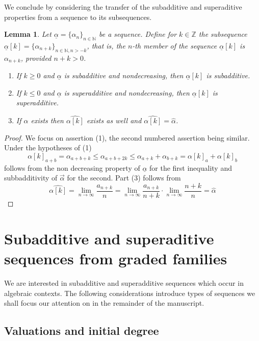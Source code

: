 \documentclass[12pt, reqno]{amsart}
\numberwithin{equation}{section}
\def\a{\ensuremath{\alpha}}
\def\ua{\ensuremath{\underline{\alpha}}}
\newcommand{\wa}{\widehat{\alpha}}
\newcommand{\N}{{\mathbb N}}
\newcommand{\Z}{{\mathbb Z}}
\theoremstyle{plain} %
\newtheorem{lem}[thm]{Lemma}
\theoremstyle{definition}
\theoremstyle{remark}
\newcommand{\au}{\overrightarrow{\alpha}}
\begin{document}
We conclude by considering the transfer of the subadditive and superaditive properties from a sequence to its subsequences.

\begin{lem}
\label{lem:subseq}
Let $\ua=\{\a_n\}_{n\in\N}$ be a sequence. Define for $k\in\Z$ the subsequence $\ua[k]=\{\a_{n+k}\}_{n\in\N,n> -k}$, that is, the $n$-th member of the sequence $\ua[k]$ is $\a_{n+k}$, provided $n+k>0$.
\begin{enumerate}
\item If $k\ge 0$ and $\ua$ is subadditive and nondecreasing, then $\ua[k]$ is subadditive.
\item If $k\le 0$ and $\ua$ is superadditive and nondecreasing, then $\ua[k]$ is superadditive.
\item If $\wa$ exists then $\widehat{\a[k]}$ exists as well and $\widehat{\a[k]}=\wa$.
\end{enumerate}

\end{lem}
\begin{proof}
We focus on assertion (1), the second numbered assertion being similar. Under the hypotheses of (1)
\[
\a[k]_{a+b}=\a_{a+b+k} \leq \a_{a+b+2k} \leq \a_{a+k}+\a_{b+k}=\a[k]_a+\a[k]_b
\]
follows from the non decreasing property of $\ua$  for the first inequality and subbadditivity of $\au$ for the second.
Part (3) follows from
\[
\widehat{\a[k]}=\lim_{n\to \infty}\frac{a_{n+k}}{n}=\lim_{n\to \infty} \frac{a_{n+k}}{n+k}\cdot \lim_{n\to \infty}\frac{n+k}{n}=\wa
\]
\end{proof}

\section{Subadditive and superaditive sequences from graded families}
\label{sec:SequencesFromGradedFamilies}

We are interested in subadditive and superadditive sequences which occur in algebraic contexts. The following considerations introduce types of sequences we shall focus our attention on in the remainder of the manuscript.

\subsection{Valuations and initial degree}
\label{sect:initdeg}
\end{document}
